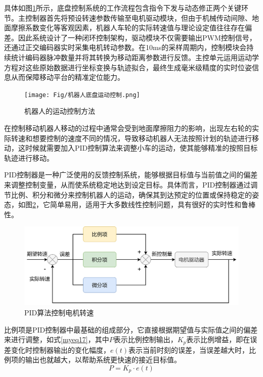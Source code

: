 具体如图\ref{motion_control}所示，底盘控制系统的工作流程包含指令下发与动态修正两个关键环节。主控制器首先将预设转速参数传输至电机驱动模块，但由于机械传动间隙、地面摩擦系数变化等客观因素，机器人车轮的实际转速值与理论设定值往往存在偏差。因此系统设计了一种闭环控制架构，驱动模块不仅需要输出PWM控制信号，还通过正交编码器实时采集电机转动参数。在10ms的采样周期内，控制模块会持续统计编码器脉冲数量并将其转换为移动距离参数进行反馈。主控单元运用运动学方程对这些原始数据进行坐标变换与轨迹拟合，最终生成毫米级精度的实时位姿信息从而保障移动平台的精准定位能力。


\begin{figure}[htbp]
    \centering
    \texttt{[image: Fig/机器人底盘运动控制.png]}
    \caption{\label{motion_control}机器人的运动控制方法}
\end{figure}

在控制移动机器人移动的过程中通常会受到地面摩擦阻力的影响，出现左右轮的实际转速和想要控制的速度不同的情况，导致移动机器人无法按照计划的轨迹进行移动，这时候就需要加入PID控制算法来调整小车的运动，使其能够精准的按照目标轨迹进行移动。

PID控制器是一种广泛使用的反馈控制系统，能够根据目标值与当前值之间的偏差来调整控制变量，从而使系统稳定地达到设定目标。具体而言，PID控制器通过调节比例、积分和微分来控制机器人的运动，确保其到达预定的位置或保持稳定的姿态，如图\ref{pid}，它简单易用，适用于大多数线性控制问题，具有很好的实时性和鲁棒性。
\begin{figure}[htbp]
    \centering
    \includegraphics[scale=0.10]{Fig/pid.png}
    \caption{\label{pid}PID算法控制电机转速}
\end{figure}

比例项是PID控制器中最基础的组成部分，它直接根据期望值与实际值之间的偏差来进行调整，如式\ref{myeq17}，其中$P$表示比例控制输出，${K_p}$表示比例增益，即在误差变化时控制器输出的变化幅度，$e\left( t \right)$表示当前时刻的误差，当误差越大时，比例项的输出也就越大，以帮助系统更快速的接近目标值。
\begin{equation}
    P = {K_p} \cdot e\left( t \right)
    \label{myeq17}
\end{equation}

